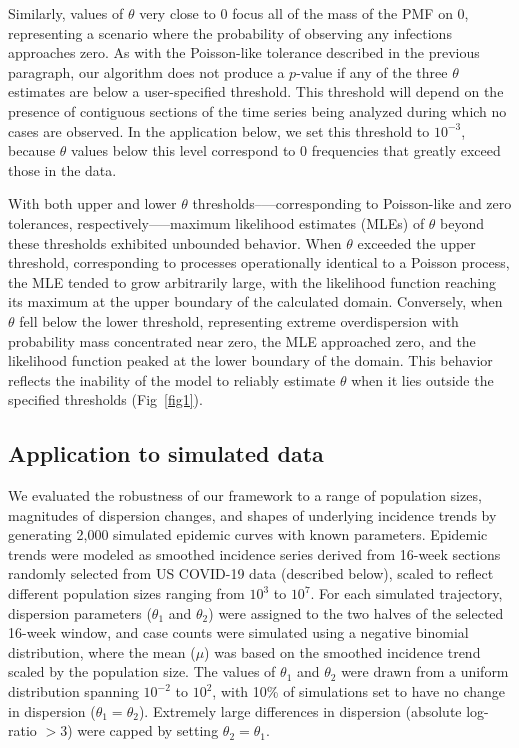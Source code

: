 \documentclass[11pt,letterpaper]{article}
\begin{document}
Similarly, values of $\theta$ very close to 0 focus all of the mass of the PMF on 0, representing a scenario where the probability of observing any infections approaches zero. As with the Poisson-like tolerance described in the previous paragraph, our algorithm does not produce a $p$-value if any of the three $\theta$ estimates are below a user-specified threshold. This threshold will depend on the presence of contiguous sections of the time series being analyzed during which no cases are observed. In the application below, we set this threshold to $10^{-3}$, because $\theta$ values below this level correspond to 0 frequencies that greatly exceed those in the data.

With both upper and lower $\theta$ thresholds--—corresponding to Poisson-like and zero tolerances, respectively—--maximum likelihood estimates (MLEs) of $\theta$ beyond these thresholds exhibited unbounded behavior. When $\theta$ exceeded the upper threshold, corresponding to processes operationally identical to a Poisson process, the MLE tended to grow arbitrarily large, with the likelihood function reaching its maximum at the upper boundary of the calculated domain. Conversely, when $\theta$ fell below the lower threshold, representing extreme overdispersion with probability mass concentrated near zero, the MLE approached zero, and the likelihood function peaked at the lower boundary of the domain. This behavior reflects the inability of the model to reliably estimate $\theta$ when it lies outside the specified thresholds (Fig~\ref{fig1}).

\subsection*{Application to simulated data}
We evaluated the robustness of our framework to a range of population sizes, magnitudes of dispersion changes, and shapes of underlying incidence trends by generating 2,000 simulated epidemic curves with known parameters. 
Epidemic trends were modeled as smoothed incidence series derived from 16-week sections randomly selected from US COVID-19 data (described below), scaled to reflect different population sizes ranging from $10^3$ to $10^7$. 
For each simulated trajectory, dispersion parameters ($\theta_1$ and $\theta_2$) were assigned to the two halves of the selected 16-week window, and case counts were simulated using a negative binomial distribution, where the mean ($\mu$) was based on the smoothed incidence trend scaled by the population size. 
The values of $\theta_1$ and $\theta_2$ were drawn from a uniform distribution spanning $10^{-2}$ to $10^{2}$, with 10\% of simulations set to have no change in dispersion ($\theta_1 = \theta_2$). 
Extremely large differences in dispersion (absolute log-ratio $>3$) were capped by setting $\theta_2 = \theta_1$. 
\end{document}
